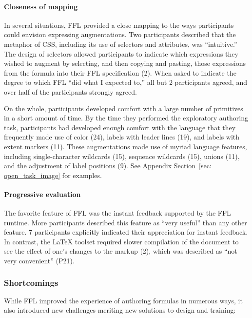 \paragraph{Closeness of mapping}

In several situations, FFL provided a close mapping to the ways participants could envision expressing augmentations. Two participants described that the metaphor of CSS, including its use of selectors and attributes, was ``intuitive.'' The design of selectors allowed participants to indicate which expressions they wished to augment by selecting, and then copying and pasting, those expressions from the formula into their FFL specification (2). When asked to indicate the degree to which FFL ``did what I expected to,'' all but 2 participants agreed, and over half of the participants strongly agreed.

On the whole, participants developed comfort with a large number of primitives in a short amount of time. By the time they performed the exploratory authoring task, participants had developed enough comfort with the language that they frequently made use of color (24), labels with leader lines (19), and labels with extent markers (11). These augmentations made use of myriad language features, including single-character wildcards (15), sequence wildcards (15), unions (11), and the adjustment of label positions (9). See Appendix Section~\ref{sec: open_task_image} for examples.

\paragraph{Progressive evaluation}

The favorite feature of FFL was the instant feedback supported by the FFL runtime. More participants described this feature as ``very useful'' than any other feature. 7 participants explicitly indicated their appreciation for instant feedback. In contrast, the LaTeX toolset required slower compilation of the document to see the effect of one's changes to the markup (2), which was described as ``not very convenient'' (P21).

\subsubsection{Shortcomings}\label{sec:shortcomings} While FFL improved the experience of authoring formulas in numerous ways, it also introduced new challenges meriting new solutions to design and training:

